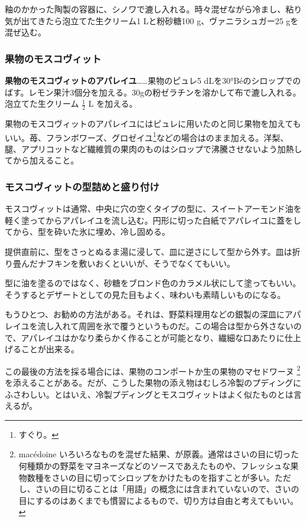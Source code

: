 釉のかかった陶製の容器に、シノワで漉し入れる。時々混ぜながら冷まし、粘り気が出てきたら泡立てた生クリーム1
Lと粉砂糖100 g、ヴァニラシュガー25 gを混ぜ込む。

\hypertarget{moscovite-aux-fruits}{%
\subsubsection{果物のモスコヴィット}\label{moscovite-aux-fruits}}

\textbf{果物のモスコヴィットのアパレイユ}\ldots{}\ldots{}果物のピュレ5
dLを30°Béのシロップでのばす。レモン果汁3個分を加える。30gの粉ゼラチンを溶かして布で漉し入れる。泡立てた生クリーム
\(\frac{1}{2}\) L を加える。

果物のモスコヴィットのアパレイユにはピュレに用いたのと同じ果物を加えてもいい。苺、フランボワーズ、グロゼイユ\footnote{すぐり。}などの場合はのまま加える。洋梨、腿、アプリコットなど繊維質の果肉のものはシロップで沸騰させないよう加熱してから加えること。

\hypertarget{moulage-et-dressage-des-moscovites}{%
\subsubsection{モスコヴィットの型詰めと盛り付け}\label{moulage-et-dressage-des-moscovites}}

モスコヴィットは通常、中央に穴の空くタイプの型に、スイートアーモンド油を軽く塗ってからアパレイユを流し込む。円形に切った白紙でアパレイユに蓋をしてから、型を砕いた氷に埋め、冷し固める。

提供直前に、型をさっとぬるま湯に浸して、皿に逆さにして型から外す。皿は折り畳んだナフキンを敷いおくといいが、そうでなくてもいい。

型に油を塗るのではなく、砂糖をブロンド色のカラメル状にして塗ってもいい。そうするとデザートとしての見た目もよく、味わいも素晴しいものになる。

もうひとつ、お勧めの方法がある。それは、野菜料理用などの銀製の深皿にアパレイユを流し入れて周囲を氷で覆うというものだ。この場合は型から外さないので、アパレイユはかなり柔らかく作ることが可能となり、繊細な口あたりに仕上げることが出来る。

この最後の方法を採る場合には、果物のコンポートか生の果物のマセドワーヌ
\footnote{macédoine
  いろいろなものを混ぜた結果、が原義。通常はさいの目に切った何種類かの野菜をマヨネーズなどのソースであえたものや、フレッシュな果物数種をさいの目に切ってシロップをかけたものを指すことが多い。ただし、さいの目に切ることは「用語」の概念には含まれていないので、さいの目にするのはあくまでも慣習によるもので、切り方は自由と考えてもいい。}を添えることがある。だが、こうした果物の添え物はむしろ冷製のプディングにふさわしい。とはいえ、冷製プディングとモスコヴィットはよく似たものとは言えるが。

